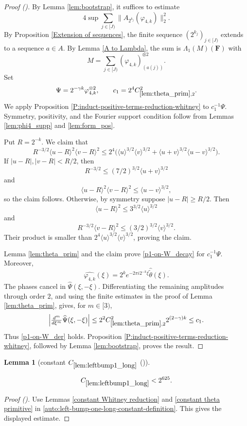 \documentclass[12pt,reqno]{amsart}
\newcommand{\auto}{{({\tiny\faCar})}}
\theoremstyle{plain}
\newtheorem{lemma}[theorem]{Lemma}
\numberwithin{equation}{section}
\theoremstyle{remark}
\newcommand{\uses}[1]{}
\newcommand{\usesdefs}[1]{}
\newcommand{\leanok}{}
\newcommand{\lean}[1]{}
\newcommand{\F}{\mathbf{F}}
\begin{document}
\begin{proof}[Proof \auto]
By Lemma \ref{lem:bootstrap}, it suffices to estimate
\[
4\sup\sum_{j\in[J)}\|A_{2^{k_j}}(\varphi_{4,k})\|_2^2.
\]
By Proposition \ref{Extension of sequences}, the finite sequence $(2^{k_j})_{j\in[J)}$ extends to a sequence $a\in A$. By Lemma \ref{A to Lambda}, the sum is $\Lambda_1(M)(\F)$ with
\[
M=\sum_{j\in[J)}(\varphi_{4,k})_{(a(j))}^{\otimes2}.
\]
Set
\[
\Psi=2^{-\gamma k}\varphi_{4,k}^{\otimes2},
\qquad
c_1=2^4C_{\ref{lem:theta_prim},2}^2.
\]
We apply Proposition \ref{P:induct-positive-terms-reduction-whitney} to $c_1^{-1}\Psi$. Symmetry, positivity, and the Fourier support condition follow from Lemmas \ref{lem:phi4_supp} and \ref{lem:form_pos}.

Put $R=2^{-k}$. We claim that
\[
R^{-3/2}\langle u-R\rangle^2\langle v-R\rangle^2
\le2^4\bigl(
\langle u\rangle^{3/2}\langle v\rangle^{3/2}
+\langle u+v\rangle^{3/2}\langle u-v\rangle^{3/2}
\bigr).
\]
If $|u-R|,|v-R|<R/2$, then
\[
R^{-3/2}\le(7/2)^{3/2}\langle u+v\rangle^{3/2}
\]
and
\[
\langle u-R\rangle^2\langle v-R\rangle^2
\le\langle u-v\rangle^{3/2},
\]
so the claim follows. Otherwise, by symmetry suppose $|u-R|\ge R/2$. Then
\[
\langle u-R\rangle^2\le3^{3/2}\langle u\rangle^{3/2}
\]
and
\[
R^{-3/2}\langle v-R\rangle^2
\le(3/2)^{3/2}\langle v\rangle^{3/2}.
\]
Their product is smaller than $2^4\langle u\rangle^{3/2}\langle v\rangle^{3/2}$, proving the claim.

Lemma \ref{lem:theta_prim} and the claim prove \eqref{p1-on-W_decay} for $c_1^{-1}\Psi$. Moreover,
\[
\widehat{\varphi_{4,k}}(\xi)
=2^ke^{-2\pi i2^{-k}\xi}\widehat{\widetilde\theta}(\xi).
\]
The phases cancel in $\widehat\Psi(\xi,-\xi)$. Differentiating the remaining amplitudes through order $2$, and using the finite estimates in the proof of Lemma \ref{lem:theta_prim}, gives, for $m\in[3)$,
\[
\left|\tfrac{d^m}{d\xi^m}\widehat\Psi(\xi,-\xi)\right|
\le2^2C_{\ref{lem:theta_prim},2}^2 2^{(2-\gamma)k}
\le c_1.
\]
Thus \eqref{p1-on-W_der} holds. Proposition \ref{P:induct-positive-terms-reduction-whitney}, followed by Lemma \ref{lem:bootstrap}, proves the result.
\end{proof}

\begin{lemma}[constant $C_{\ref{lem:leftbump1_long}}$ \auto]\label{constant left bump one long}\uses{constant Whitney reduction,constant theta primitive,lem:leftbump1_long}\usesdefs{}
\lean{Auto.constantLeftBumpOneLong}
\leanok
\begin{equation}\label{constant left bump one long bound}
C_{\ref{lem:leftbump1_long}}<2^{625}.
\end{equation}
\end{lemma}
\begin{proof}[Proof \auto]
Use Lemmas \ref{constant Whitney reduction} and \ref{constant theta primitive} in \eqref{auto:left-bump-one-long-constant-definition}. This gives the displayed estimate.
\end{proof}
\end{document}
